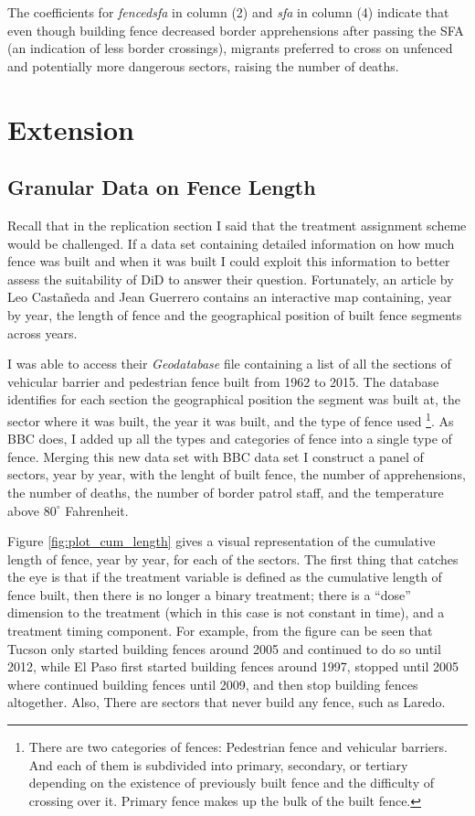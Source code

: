 \documentclass[titlepage]{article}
\theoremstyle{plain}
\theoremstyle{plain}
\begin{document}
The coefficients for \textit{fencedsfa} in column (2) and \textit{sfa} in column (4) indicate that even though building fence decreased border apprehensions after passing the SFA (an indication of less border crossings), migrants preferred to cross on unfenced and potentially more dangerous sectors, raising the number of deaths.

\section*{Extension}

\subsection*{Granular Data on Fence Length}

Recall that in the replication section I said that the treatment assignment scheme would be challenged. If a data set containing detailed information on how much fence was built and when it was built I could exploit this information to better assess the suitability of DiD to answer their question. Fortunately, an article by Leo Castañeda and Jean Guerrero \cite*{castaneda2017} contains an interactive map containing, year by year, the length of fence and the geographical position of built fence segments across years.

I was able to access their \textit{Geodatabase} file containing a list of all the sections of vehicular barrier and pedestrian fence built from 1962 to 2015. The database identifies for each section the geographical position the segment was built at, the sector where it was built, the year it was built, and the type of fence used \footnote{There are two categories of fences: Pedestrian fence and vehicular barriers. And each of them is subdivided into primary, secondary, or tertiary depending on the existence of previously built fence and the difficulty of crossing over it. Primary fence makes up the bulk of the built fence.}. As BBC does, I added up all the types and categories of fence into a single type of fence. Merging this new data set with BBC data set I construct a panel of sectors, year by year, with the lenght of built fence, the number of apprehensions, the number of deaths, the number of border patrol staff, and the temperature above $80^{\circ}$ Fahrenheit.

Figure \ref{fig:plot_cum_length} gives a visual representation of the cumulative length of fence, year by year, for each of the sectors. The first thing that catches the eye is that if the treatment variable is defined as the cumulative length of fence built, then there is no longer a binary treatment; there is a \enquote{dose} dimension to the treatment (which in this case is not constant in time), and a treatment timing component. For example, from the figure can be seen that Tucson only started building fences around 2005 and continued to do so until 2012, while El Paso first started building fences around 1997, stopped until 2005 where continued building fences until 2009, and then stop building fences altogether. Also, There are sectors that never build any fence, such as Laredo.
\end{document}
